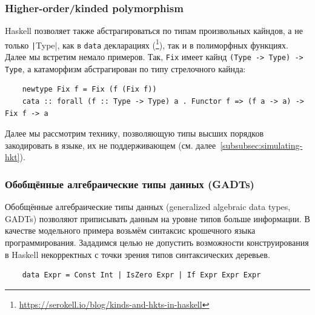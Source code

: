 \subsubsection{Higher-order/kinded polymorphism}

Haskell позволяет также абстрагироваться по типам произвольных кайндов, а не только \texttt|Type|, как в \texttt{data} декларациях (\footnote{\url{https://serokell.io/blog/kinds-and-hkts-in-haskell}}), так и в полиморфных функциях.
Далее мы встретим немало примеров.
Так, \texttt{Fix} имеет кайнд \texttt{(Type -> Type) -> Type}, а катаморфизм абстрагирован по типу стрелочного кайнда:
\begin{verbatim}
    newtype Fix f = Fix (f (Fix f))
    cata :: forall (f :: Type -> Type) a . Functor f => (f a -> a) -> Fix f -> a
\end{verbatim}

Далее мы рассмотрим технику, позволяющую типы высших порядков закодировать в языке, их не поддерживающем (см. далее~\ref{subsubsec:simulating-hkt}).


\subsubsection{Обобщённые алгебраические типы данных (GADTs)} \label{subsubsec:gadts}

Обобщённые алгебраические типы данных (generalized algebraic data types, GADTs) позволяют приписывать данным на уровне типов больше информации.
В качестве модельного примера возьмём синтаксис крошечного языка программирования.
Зададимся целью не допустить возможности конструирования в Haskell некорректных с точки зрения типов синтаксических деревьев.
\begin{verbatim}
    data Expr = Const Int | IsZero Expr | If Expr Expr Expr
\end{verbatim}

